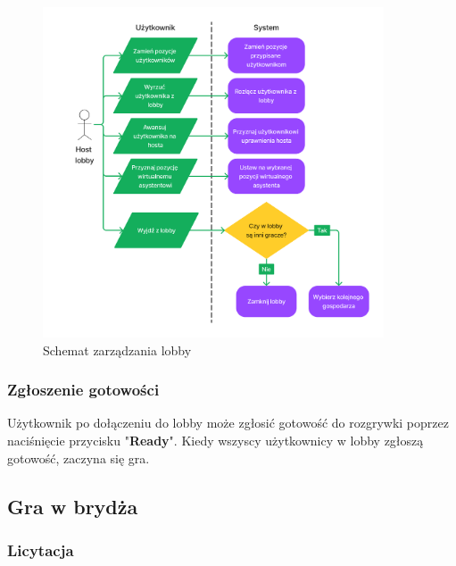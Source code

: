 \begin{figure}[hbt!]
  \centering
  \includegraphics[width=0.9\textwidth]{img/schematy/manage_lobby.png}
  \caption{Schemat zarządzania lobby}
\end{figure}

\FloatBarrier


\subsubsection{Zgłoszenie gotowości}
Użytkownik po dołączeniu do lobby może zgłosić gotowość do rozgrywki poprzez
naciśnięcie przycisku "\textbf{Ready}". Kiedy wszyscy użytkownicy w lobby zgłoszą
gotowość, zaczyna się gra.


\subsection{Gra w brydża}

\subsubsection{Licytacja}


